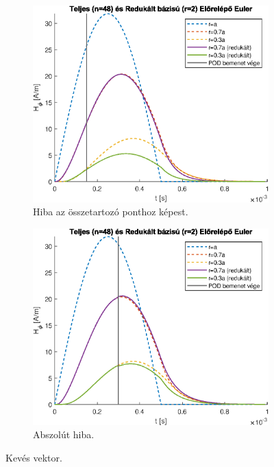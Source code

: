         \begin{figure}[h]
            \centering
            \begin{subfigure}{0.48\textwidth}
                \includegraphics[width=\textwidth]{kep/euler_0.15_2_td.eps}
                \caption{Hiba az összetartozó ponthoz képest.}
            \end{subfigure}
            \begin{subfigure}{0.48\textwidth}
                \includegraphics[width=\textwidth]{kep/euler_0.3_2_td.eps}
                \caption{Abszolút hiba.}
            \end{subfigure}
            \caption{Kevés vektor.}
            \label{fig:keves_vektor}
        \end{figure}
    
    


